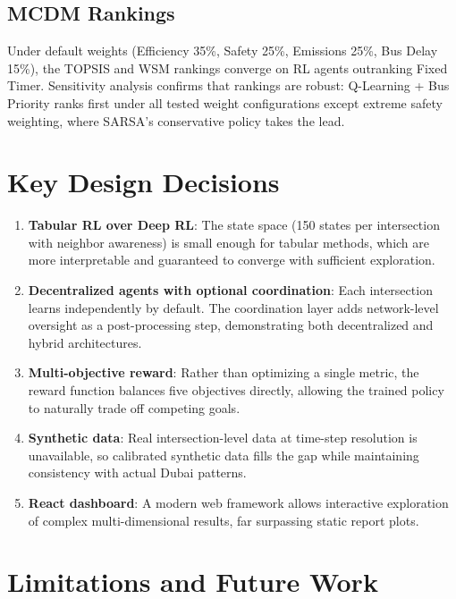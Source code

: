 \documentclass[12pt, a4paper]{article}
\begin{document}
\subsection{MCDM Rankings}

Under default weights (Efficiency 35\%, Safety 25\%, Emissions 25\%, Bus Delay 15\%), the TOPSIS and WSM rankings converge on RL agents outranking Fixed Timer. Sensitivity analysis confirms that rankings are robust: Q-Learning + Bus Priority ranks first under all tested weight configurations except extreme safety weighting, where SARSA's conservative policy takes the lead.

\section{Key Design Decisions}

\begin{enumerate}[nosep]
    \item \textbf{Tabular RL over Deep RL}: The state space (150 states per intersection with neighbor awareness) is small enough for tabular methods, which are more interpretable and guaranteed to converge with sufficient exploration.
    \item \textbf{Decentralized agents with optional coordination}: Each intersection learns independently by default. The coordination layer adds network-level oversight as a post-processing step, demonstrating both decentralized and hybrid architectures.
    \item \textbf{Multi-objective reward}: Rather than optimizing a single metric, the reward function balances five objectives directly, allowing the trained policy to naturally trade off competing goals.
    \item \textbf{Synthetic data}: Real intersection-level data at time-step resolution is unavailable, so calibrated synthetic data fills the gap while maintaining consistency with actual Dubai patterns.
    \item \textbf{React dashboard}: A modern web framework allows interactive exploration of complex multi-dimensional results, far surpassing static report plots.
\end{enumerate}

\section{Limitations and Future Work}
\end{document}
